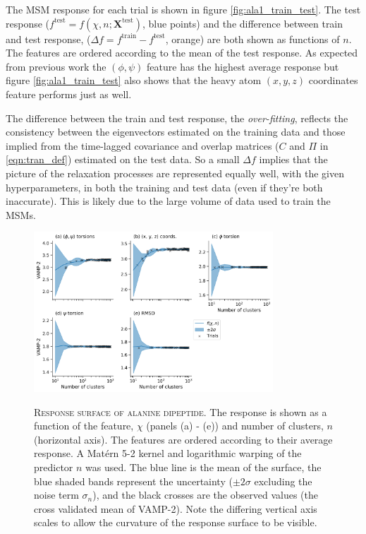 The MSM response for each trial is shown in figure \ref{fig:ala1_train_test}. The test response ($f^{\mathrm{test}} = f\left(\chi, n; \mathbf{X}^{\mathrm{test}}\right)$, blue points) and the difference between train and test response, ($\Delta f = f^{\mathrm{train}} - f^{\mathrm{test}}$, orange) are both shown as functions of $n$. The features are ordered according to the  mean of the test response. As expected from previous work \cite{bolhuis2000reaction} the  $(\phi, \psi)$ feature has the highest average response but figure \ref{fig:ala1_train_test} also shows that the heavy atom $(x,y,z)$ coordinates feature performs just as well. 

The difference between the train and test response, the \emph{over-fitting}, reflects the consistency between the eigenvectors estimated on the training data and those implied from the time-lagged covariance and overlap matrices ($C$ and $\Pi$  in \ref{eqn:tran_def}) estimated  on the test data. So a small $\Delta f$ implies that the picture of the relaxation processes are represented equally well, with the given hyperparameters, in both the training and test data (even if they're both inaccurate). This is likely due to the large volume of data used to train the MSMs. 

\begin{figure}
    \centering
    \caption[Response surface of alanine dipeptide]{\textsc{Response surface of alanine dipeptide}. The response is shown as a function of the feature, $\chi$ (panels (a) - (e)) and number of clusters, $n$ (horizontal axis). The features are ordered according to their average response. A Mat\'{e}rn 5-2 kernel and logarithmic warping of the predictor $n$  was used. The blue line is the mean of the surface, the blue shaded bands represent the uncertainty ($\pm2\sigma$ excluding the noise term $\sigma_{n}$), and the black crosses are the observed values (the cross validated mean of VAMP-2). Note the differing vertical axis scales to allow the curvature of the response surface to be visible.}
    \includegraphics[width=0.8\textwidth]{chapters/msm_optimization/figures/ala1_response_surface.png}
    \label{fig:ala1_response}
\end{figure}

